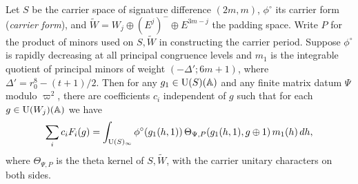 \begin{lemma}
\label{lem:c-kernel-carrier-span}
\emitthmsource
Let $S$ be the carrier space of signature difference $(2m,m)$, $\phi^\circ$ its carrier form (\emph{carrier form}), and $\widetilde W=W_j\oplus(E^j)^-\oplus E^{3m-j}$ the padding space. Write $P$ for the product of minors used on $S,\widetilde W$ in constructing the carrier period. Suppose $\phi^\circ$ is rapidly decreasing at all principal congruence levels and $m_1$ is the integrable quotient of principal minors of weight $(-\Delta';6m+1)$, where $\Delta'=r_0^8-(t+1)/2$. Then for any $g_1\in \operatorname{U}(S)(\mathbb A)$ and any finite matrix datum $\Psi$ modulo $\varpi^2$, there are coefficients $c_i$ independent of $g$ such that for each $g\in \operatorname{U}(W_j)(\mathbb A)$ we have
\[
 \sum_i c_iF_i(g)=
 \int_{\operatorname{U}(S)_\infty}
 \phi^\circ(g_1(h,1))\,\Theta_{\Psi,P}(g_1(h,1),g\oplus1)\,m_1(h)\,dh ,
\]
where $\Theta_{\Psi,P}$ is the theta kernel of $S,\widetilde W$, with the carrier unitary characters on both sides.
\end{lemma}

